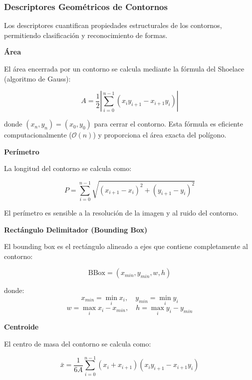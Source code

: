 \subsubsection{Descriptores Geométricos de Contornos}

Los descriptores cuantifican propiedades estructurales de los contornos, permitiendo clasificación y reconocimiento de formas.

\textbf{Área}

El área encerrada por un contorno se calcula mediante la fórmula del Shoelace (algoritmo de Gauss):

\begin{equation}
A = \frac{1}{2}\left|\sum_{i=0}^{n-1}(x_i y_{i+1} - x_{i+1}y_i)\right|
\end{equation}

donde $(x_n, y_n) = (x_0, y_0)$ para cerrar el contorno. Esta fórmula es eficiente computacionalmente ($\mathcal{O}(n)$) y proporciona el área exacta del polígono.

\textbf{Perímetro}

La longitud del contorno se calcula como:

\begin{equation}
P = \sum_{i=0}^{n-1}\sqrt{(x_{i+1}-x_i)^2 + (y_{i+1}-y_i)^2}
\end{equation}

El perímetro es sensible a la resolución de la imagen y al ruido del contorno.

\textbf{Rectángulo Delimitador (Bounding Box)}

El bounding box es el rectángulo alineado a ejes que contiene completamente al contorno:

\begin{equation}
\text{BBox} = (x_{min}, y_{min}, w, h)
\end{equation}

donde:
\begin{equation}
x_{min} = \min_{i} x_i, \quad y_{min} = \min_{i} y_i
\end{equation}
\begin{equation}
w = \max_{i} x_i - x_{min}, \quad h = \max_{i} y_i - y_{min}
\end{equation}

\textbf{Centroide}

El centro de masa del contorno se calcula como:

\begin{equation}
\bar{x} = \frac{1}{6A}\sum_{i=0}^{n-1}(x_i + x_{i+1})(x_i y_{i+1} - x_{i+1}y_i)
\end{equation}


